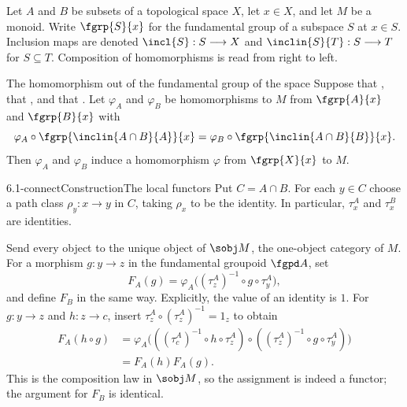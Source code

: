 Let $A$ and $B$ be subsets of a topological space $X$, let $x\in X$, and let
$M$ be a monoid.  Write $\fgrp{S}{x}$ for the fundamental group of a subspace
$S$ at $x\in S$.  Inclusion maps are denoted $\incl{S}:S\longrightarrow X$
and $\inclin{S}{T}:S\longrightarrow T$ for $S\subseteq T$.  Composition of
homomorphisms  is read from right to left.

\begin{definition}[id=6.1]{The homomorphism out of the fundamental group of the space}
Suppose that \hypCoverTwo, that \hypPathConnected, and that \hypBasepoint.  Let
$\varphi_{A}$ and $\varphi_{B}$ be homomorphisms to $M$ from $\fgrp{A}{x}$ and
$\fgrp{B}{x}$ with
\[
  \varphi_{A} \circ \fgrp{\inclin{A \cap B}{A}}{x}
    = \varphi_{B} \circ \fgrp{\inclin{A \cap B}{B}}{x}.
\]
Then $\varphi_{A}$ and $\varphi_{B}$ induce a homomorphism $\varphi$ from
$\fgrp{X}{x}$ to $M$.
\end{definition}

\begin{proofpassage}{6.1-connect}{Construction}{The local functors}
Put $C=A\cap B$.  For each $y\in C$ choose a path class
$\rho_y:x\longrightarrow y$ in $C$, taking $\rho_x$ to be the identity.
  In particular, $\tau^A_x$ and $\tau^B_x$ are identities.

Send every object to the unique object of $\sobj M$, the one-object category
of $M$.  For a morphism
$g:y\longrightarrow z$ in the fundamental groupoid $\fgpd A$, set
\[
 F_A(g)=\varphi_A\bigl((\tau^A_z)^{-1}\circ g\circ\tau^A_y\bigr),
\]
and define $F_B$ in the same way.    Explicitly, the value of an identity is $1$.  For
$g:y\longrightarrow z$ and $h:z\longrightarrow c$, insert
$\tau^A_z\circ(\tau^A_z)^{-1}=1_z$ to obtain
\[
\begin{aligned}
 F_A(h\circ g)
 &=\varphi_A\bigl(((\tau^A_c)^{-1}\circ h\circ\tau^A_z)
            \circ((\tau^A_z)^{-1}\circ g\circ\tau^A_y)\bigr)\\
 &=F_A(h)F_A(g).
\end{aligned}
\]
This is the composition law in $\sobj M$, so the assignment is indeed a
functor; the argument for $F_B$ is identical.
\end{proofpassage}

